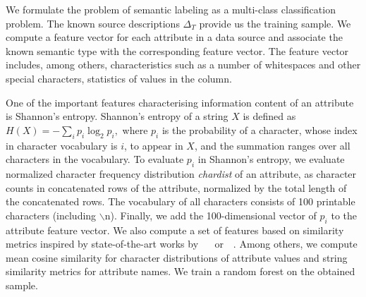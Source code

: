 \documentclass[letterpaper]{article} %
\newcommand{\authornote}[3]{
  {\fbox{\sc 
  #1}:$\blacktriangleright$\textcolor{#2}{\small{#3}}$\blacktriangleleft$}%
}
\newcommand{\npr}[1]{\authornote{NPR}{orange}{#1}}
\newcommand{\ignore}[1]{}
\newcommand{\forijcai}[1]{}
\newcommand{\citeasnoun}[1]{\citeauthor{#1}~\shortcite{#1}}
\begin{document}
We formulate the problem of semantic labeling as a multi-class classification
problem.
The known source descriptions $\Delta_T$ provide us the training sample.
We compute a feature vector for each attribute in a data source and associate 
the known semantic type with the corresponding feature vector.
The feature vector includes, among others, characteristics
such as a number 
of whitespaces and other special characters, statistics of 
values in the column. 
\forijcai{A full list can be found in Appendix \ref{Ann:SemLab}.}
One of the important features characterising information content of an attribute is Shannon's entropy.
Shannon's entropy 
 of a string $X$ is defined as
$H(X) = -\sum_{i}{p_i \log_{2}p_i},$ where $p_i$ is the probability of a character, whose index in character vocabulary is $i$, to appear in $X$, and the summation ranges over all
characters in the vocabulary.
To evaluate $p_i$ in Shannon's entropy, we evaluate normalized character frequency distribution \emph{chardist} of an attribute, as character counts in concatenated rows of the attribute, normalized by the total length of the concatenated rows.
The vocabulary of all characters consists of 100 printable characters (including $\backslash$n).
Finally, we add the 100-dimensional vector of $p_i$ to the attribute feature vector.
We also compute a set of features based on similarity metrics inspired by state-of-the-art works by ~\citeasnoun{Pham:semantic} or~\citeasnoun{Ritze:matching}.
Among others, we compute mean cosine similarity for character distributions of attribute values and string similarity metrics for attribute names.
We train a random forest on the obtained sample. 
\end{document}

